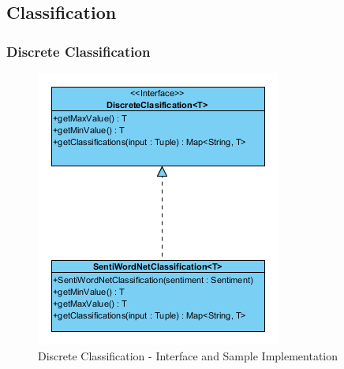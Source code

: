 \documentclass[a4paper]{article}
\begin{document}
\subsection{Classification}
\subsubsection{Discrete Classification}
\begin{figure}[h!]
	\centering
	\includegraphics[scale=2.5]{images/uml_discrete.png}
	\caption{Discrete Classification - Interface and Sample Implementation}
	\label{uml_fuzzy}
\end{figure}
\end{document}

